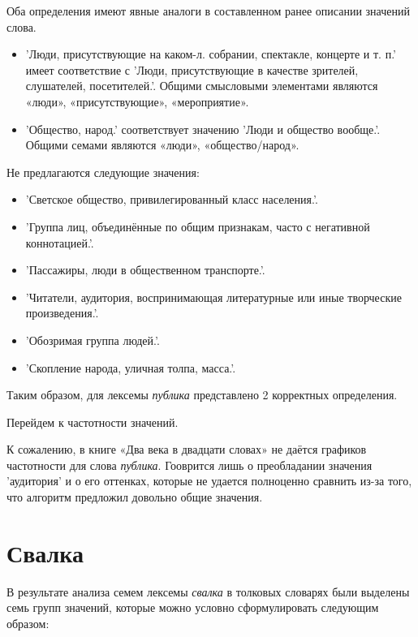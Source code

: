 Оба определения имеют явные аналоги в составленном ранее описании значений слова.

\begin{itemize}
    \item ’Люди, присутствующие на каком-л. собрании, спектакле, концерте и т. п.’ имеет соответствие с
    ’Люди, присутствующие в качестве зрителей, слушателей, посетителей.’.
    Общими смысловыми элементами являются «люди», «присутствующие», «мероприятие».

    \item ’Общество, народ.’ соответствует значению ’Люди и общество вообще.’.
    Общими семами являются «люди», «общество/народ».
\end{itemize}

Не предлагаются следующие значения:
\begin{itemize}
    \item ’Светское общество, привилегированный класс населения.’.
    \item ’Группа лиц, объединённые по общим признакам, часто с негативной коннотацией.’.
    \item ’Пассажиры, люди в общественном транспорте.’.
    \item ’Читатели, аудитория, воспринимающая литературные или иные творческие произведения.’.
    \item ’Обозримая группа людей.’.
    \item ’Скопление народа, уличная толпа, масса.’.
\end{itemize}

Таким образом, для лексемы \textit{публика} представлено 2 корректных определения.

Перейдем к частотности значений.

К сожалению, в книге «Два века в двадцати словах» не даётся
графиков частотности для слова \textit{публика}.
Гооврится лишь о преобладании значения ’аудитория’ и о его оттенках,
которые не удается полноценно сравнить из-за того, что алгоритм предложил довольно общие значения.

\section*{Свалка}

В результате анализа семем лексемы \textit{свалка} в толковых словарях были
выделены семь групп значений, которые можно условно сформулировать
следующим образом:

